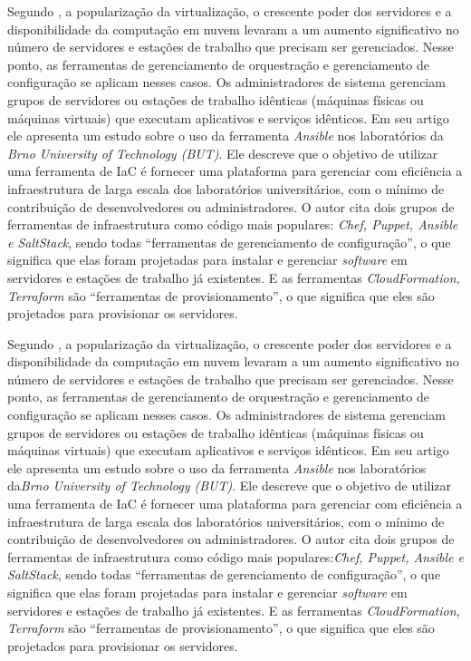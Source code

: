 Segundo , a popularização da virtualização, o crescente poder dos servidores e a disponibilidade da computação em nuvem levaram a um aumento significativo no número de servidores e estações de trabalho que precisam ser gerenciados. Nesse ponto, as ferramentas de gerenciamento de orquestração e gerenciamento de configuração se aplicam nesses casos. Os administradores de sistema gerenciam grupos de servidores ou estações de trabalho idênticas (máquinas físicas ou máquinas virtuais) que executam aplicativos e serviços idênticos. Em seu artigo ele apresenta um estudo sobre o uso da ferramenta \textit{Ansible} nos laboratórios da \textit{Brno University of Technology (BUT)}. Ele descreve que o objetivo de utilizar uma ferramenta de IaC é fornecer uma plataforma para gerenciar com eficiência a infraestrutura de larga escala dos laboratórios universitários, com o mínimo de contribuição de desenvolvedores ou administradores. O autor cita dois grupos de ferramentas de infraestrutura como código mais populares: \textit{Chef, Puppet, Ansible e SaltStack}, sendo todas “ferramentas de gerenciamento de configuração”, o que significa que elas foram projetadas para instalar e gerenciar \textit{software} em servidores e estações de trabalho já existentes. E as ferramentas  \textit{CloudFormation, Terraform} são “ferramentas de provisionamento”, o que significa que eles são projetados para provisionar os servidores.

Segundo , a popularização da virtualização, o crescente poder dos servidores e a disponibilidade da computação em nuvem levaram a um aumento significativo no número de servidores e estações de trabalho que precisam ser gerenciados. Nesse ponto, as ferramentas de gerenciamento de orquestração e gerenciamento de configuração se aplicam nesses casos. Os administradores de sistema gerenciam grupos de servidores ou estações de trabalho idênticas (máquinas físicas ou máquinas virtuais) que executam aplicativos e serviços idênticos. Em seu artigo ele apresenta um estudo sobre o uso da ferramenta \textit{Ansible} nos laboratórios da\textit{Brno University of Technology (BUT)}. Ele descreve que o objetivo de utilizar uma ferramenta de IaC é fornecer uma plataforma para gerenciar com eficiência a infraestrutura de larga escala dos laboratórios universitários, com o mínimo de contribuição de desenvolvedores ou administradores. O autor cita dois grupos de ferramentas de infraestrutura como código mais populares:\textit{Chef, Puppet, Ansible e SaltStack}, sendo todas “ferramentas de gerenciamento de configuração”, o que significa que elas foram projetadas para instalar e gerenciar \textit{software} em servidores e estações de trabalho já existentes. E as ferramentas  \textit{CloudFormation, Terraform} são “ferramentas de provisionamento”, o que significa que eles são projetados para provisionar os servidores.

